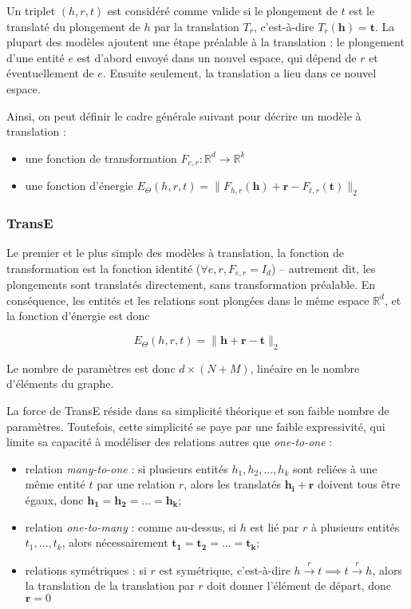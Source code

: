 Un triplet $(h, r, t)$ est considéré comme valide si le plongement de $t$ est le translaté du plongement de $h$ par la translation $T_r$, c'est-à-dire $T_r(\mathbf{h}) = \mathbf{t}$. La plupart des modèles ajoutent une étape préalable à la translation : le plongement d'une entité $e$ est d'abord envoyé dans un nouvel espace, qui dépend de $r$ et éventuellement de $e$. Ensuite seulement, la translation a lieu dans ce nouvel espace.

Ainsi, on peut définir le cadre générale suivant pour décrire un modèle à translation :
\begin{itemize}
    \item une fonction de transformation $F_{e, r} : \mathbb{R}^d \rightarrow \mathbb{R}^{k}$
    \item une fonction d'énergie $E_\Theta(h, r, t) = \| F_{h, r}(\mathbf{h}) + \mathbf{r} - F_{t, r}(\mathbf{t}) \|_2 $
\end{itemize}

\subsubsection{TransE \cite{bordes2013translating}}
Le premier et le plus simple des modèles à translation, la fonction de transformation est la fonction identité ($\forall e, r, F_{e, r} = I_d$) – autrement dit, les plongements sont translatés directement, sans transformation préalable. En conséquence, les entités et les relations sont plongées dans le même espace $\mathbb{R}^d$, et la fonction d'énergie est donc

$$ E_\Theta(h, r, t) = \| \mathbf{h + r - t} \|_2  $$

Le nombre de paramètres est donc $d \times (N + M)$, linéaire en le nombre d'éléments du graphe. 

La force de TransE réside dans sa simplicité théorique et son faible nombre de paramètres. Toutefois, cette simplicité se paye par une faible expressivité, qui limite sa capacité à modéliser des relations autres que \textit{one-to-one} :
\begin{itemize}
    \item relation \textit{many-to-one} : si plusieurs entités $h_1, h_2, \ldots, h_k$ sont reliées à une même entité $t$ par une relation $r$, alors les translatés $\mathbf{h_i + r}$ doivent tous être égaux, donc $\mathbf{h_1  = h_2 = \ldots = h_k}$;
    \item relation \textit{one-to-many} : comme au-dessus, si $h$ est lié par $r$ à plusieurs entités $t_1, \ldots, t_k$, alors nécessairement $\mathbf{t_1 = t_2 = \ldots = t_k}$;
    \item relations symétriques : si $r$ est symétrique, c'est-à-dire $h  \overset{r} \rightarrow t \implies t   \overset{r} \rightarrow h$, alors la translation de la translation par $r$ doit donner l'élément de départ, donc $\mathbf{r} = 0$
\end{itemize}

